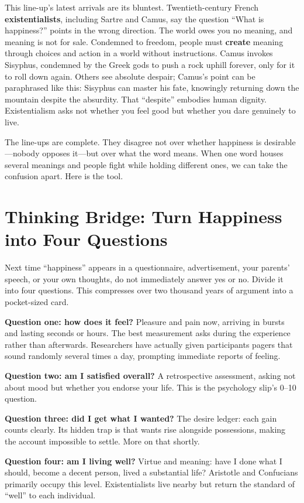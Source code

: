 This line-up's latest arrivals are its bluntest. Twentieth-century French \textbf{existentialists}, including Sartre and Camus, say the question ``What is happiness?'' points in the wrong direction. The world owes you no meaning, and meaning is not for sale. Condemned to freedom, people must \textbf{create} meaning through choices and action in a world without instructions. Camus invokes Sisyphus, condemned by the Greek gods to push a rock uphill forever, only for it to roll down again. Others see absolute despair; Camus's point can be paraphrased like this: Sisyphus can master his fate, knowingly returning down the mountain despite the absurdity. That ``despite'' embodies human dignity. Existentialism asks not whether you feel good but whether you dare genuinely to live.

The line-ups are complete. They disagree not over whether happiness is desirable---nobody opposes it---but over what the word means. When one word houses several meanings and people fight while holding different ones, we can take the confusion apart. Here is the tool.

\section[Thinking Bridge: Four Questions]{Thinking Bridge: Turn Happiness into Four Questions}
Next time ``happiness'' appears in a questionnaire, advertisement, your parents' speech, or your own thoughts, do not immediately answer yes or no. Divide it into four questions. This compresses over two thousand years of argument into a pocket-sized card.

\textbf{Question one: how does it feel?} Pleasure and pain now, arriving in bursts and lasting seconds or hours. The best measurement asks during the experience rather than afterwards. Researchers have actually given participants pagers that sound randomly several times a day, prompting immediate reports of feeling.

\textbf{Question two: am I satisfied overall?} A retrospective assessment, asking not about mood but whether you endorse your life. This is the psychology slip's 0--10 question.

\textbf{Question three: did I get what I wanted?} The desire ledger: each gain counts clearly. Its hidden trap is that wants rise alongside possessions, making the account impossible to settle. More on that shortly.

\textbf{Question four: am I living well?} Virtue and meaning: have I done what I should, become a decent person, lived a substantial life? Aristotle and Confucians primarily occupy this level. Existentialists live nearby but return the standard of ``well'' to each individual.

